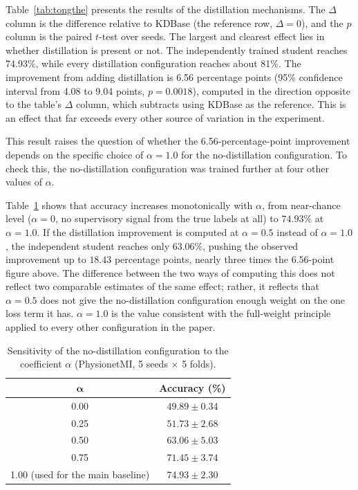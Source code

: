 Table~\ref{tab:tongthe} presents the results of the distillation
mechanisms. The $\Delta$ column is the difference relative to
KDBase (the reference row, $\Delta=0$), and the $p$ column is the
paired $t$-test over seeds. The largest and clearest effect lies in
whether distillation is present or not. The independently trained
student reaches 74.93\%, while every distillation configuration
reaches about 81\%. The improvement from adding distillation is 6.56
percentage points (95\% confidence interval from 4.08 to 9.04
points, $p = 0.0018$), computed in the direction opposite to the
table's $\Delta$ column, which subtracts using KDBase as the
reference. This is an effect that far exceeds every other source of
variation in the experiment.

This result raises the question of whether the 6.56-percentage-point
improvement depends on the specific choice of $\alpha = 1.0$ for the
no-distillation configuration. To check this, the no-distillation
configuration was trained further at four other values of $\alpha$.

Table~\ref{tab:alphasweep} shows that accuracy increases
monotonically with $\alpha$, from near-chance level ($\alpha=0$, no
supervisory signal from the true labels at all) to $74.93\%$ at
$\alpha=1.0$. If the distillation improvement
is computed at $\alpha = 0.5$ instead of $\alpha = 1.0$, the
independent student reaches only $63.06\%$, pushing the observed
improvement up to $18.43$ percentage points, nearly three times the
$6.56$-point figure above. The difference between the two ways of
computing this does not reflect two comparable estimates of the same
effect; rather, it reflects that $\alpha = 0.5$ does not give the
no-distillation configuration enough weight on the one loss term it
has. $\alpha = 1.0$ is the value consistent with the full-weight
principle applied to every other configuration in the paper.

\begin{table}[!htbp]
\centering
\caption{Sensitivity of the no-distillation configuration to the
coefficient $\alpha$ (PhysionetMI, 5 seeds $\times$ 5 folds).}
\label{tab:alphasweep}
\begin{tabular}{cc}
\toprule
$\boldsymbol{\alpha}$ & \textbf{Accuracy (\%)} \\
\midrule
0.00 & $49.89 \pm 0.34$ \\
0.25 & $51.73 \pm 2.68$ \\
0.50 & $63.06 \pm 5.03$ \\
0.75 & $71.45 \pm 3.74$ \\
1.00 (used for the main baseline) & $\boldsymbol{74.93 \pm 2.30}$ \\
\bottomrule
\end{tabular}
\end{table}
\FloatBarrier


